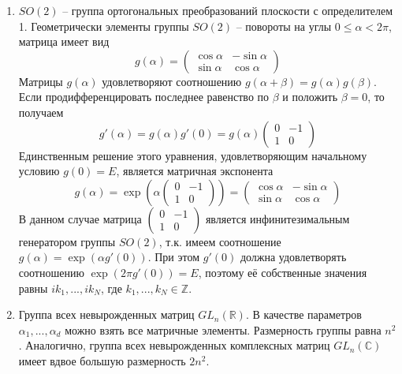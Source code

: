 \documentclass[12pt]{article}
\theoremstyle{definition}
\begin{document}
\begin{enumerate}
    \item $SO(2)$ --  группа ортогональных преобразований плоскости с определителем 1. Геометрически элементы группы $SO(2)$ -- повороты на углы $0\leq\alpha < 2\pi$, матрица имеет вид
    \begin{equation}
        g(\alpha)=\begin{pmatrix}
        \cos\alpha & -\sin\alpha\\
        \sin\alpha & \cos\alpha
        \end{pmatrix}
    \end{equation}
    Матрицы $g(\alpha)$ удовлетворяют соотношению $g(\alpha+\beta)=g(\alpha)g(\beta)$. Если продифференцировать последнее равенство по $\beta$ и положить $\beta=0$, то получаем
    \begin{equation}
        g'(\alpha)=g(\alpha)g'(0)=g(\alpha)\begin{pmatrix}
        0 & -1\\
        1 & 0
        \end{pmatrix}
    \end{equation}
    Единственным решение этого уравнения, удовлетворяющим начальному условию $g(0)=E$, является матричная экспонента
    \begin{equation}
        g(\alpha)=\exp\left(\alpha\begin{pmatrix}
        0 & -1\\
        1 & 0
        \end{pmatrix}\right)=\begin{pmatrix}
        \cos\alpha & -\sin\alpha\\
        \sin\alpha & \cos\alpha
        \end{pmatrix}
    \end{equation}
    В данном случае матрица $\begin{pmatrix}
    0 & -1\\
    1 & 0\end{pmatrix}$
    является инфинитезимальным генератором группы $SO(2)$, т.к. имеем соотношение $g(\alpha)=\exp(\alpha g'(0))$. При этом $g'(0)$ должна удовлетворять соотношению $\exp(2\pi g'(0))=E$, поэтому её собственные значения равны $ik_1,...,ik_N$, где $k_1,...,k_N\in\mathbb{Z}$.
    \item Группа всех невырожденных матриц $GL_n(\mathbb{R})$. В качестве параметров $\alpha_1,...,\alpha_d$ можно взять все матричные элементы. Размерность группы равна $n^2$. Аналогично, группа всех невырожденных комплексных матриц $GL_n(\mathbb{C})$ имеет вдвое большую размерность $2n^2$.

\end{enumerate}
\end{document}
